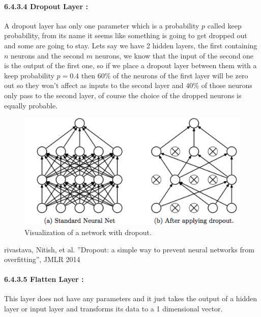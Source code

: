 \documentclass[10pt,a4paper]{article}
\begin{document}
\paragraph{6.4.3.4 Dropout Layer :}
A dropout layer has only one parameter which is a probability $ p $ called keep probability, from its name it seems like something is going to get dropped out and some are going to stay. Lets say we have 2 hidden layers, the first containing $ n $ neurons and the second $ m $ neurons, we know that the input of the second one is the output of the first one, so if we place a dropout layer between them with a keep probability $ p = 0.4 $ then $ 60\% $ of the neurons of the first layer will be zero out so they won't affect as inputs to the second layer and $ 40\% $ of those neurons only pass to the second layer, of course the choice of the dropped neurons is equally probable.
\begin{figure}[H]
\centering
\includegraphics[scale=0.4]{dropout.png}
\caption{Visualization of a network with dropout.}
\end{figure}
\begin{center}
\small rivastava, Nitish, et al. ”Dropout: a simple way to prevent neural networks from
overfitting”, JMLR 2014
\end{center}
\paragraph{6.4.3.5 Flatten Layer :}
This layer does not have any parameters and it just takes the output of a hidden layer or input layer and transforms its data to a 1 dimensional vector.
\end{document}
